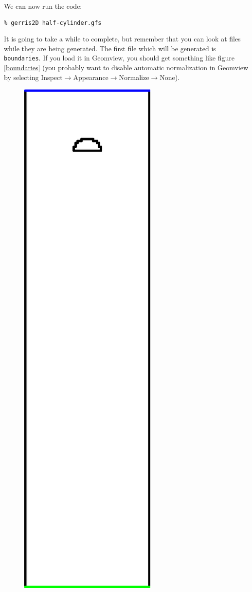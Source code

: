 \documentclass[a4paper]{article}
\begin{document}
We can now run the code:
\begin{verbatim}
% gerris2D half-cylinder.gfs
\end{verbatim}
It is going to take a while to complete, but remember that you can
look at files while they are being generated. The first file which
will be generated is {\tt boundaries}. If you load it in Geomview, you
should get something like figure \ref{boundaries} (you probably want
to disable automatic normalization in Geomview by selecting
Inspect$\rightarrow$Appearance$\rightarrow$Normalize$\rightarrow$None).
\begin{figure}[htbp]
\begin{center}
\includegraphics[angle=90,width=0.8\hsize]{boundaries.eps}

\end{center}
\end{figure}
\end{document}
